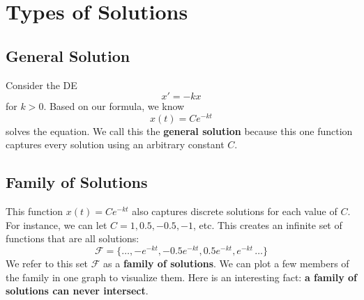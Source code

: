 \documentclass[09pt,letterpaper]{article}
\begin{document}
\section{Types of Solutions}

\subsection{General Solution}
Consider the DE 
$$x'=-kx$$ 
for $k>0$. Based on our formula, we know
$$ x(t) = C e^{-kt}$$
solves the equation. We call this the \textbf{general solution} because this one function captures every solution using an arbitrary constant $C$.

\subsection{Family of Solutions}
This function $x(t)=Ce^{-kt}$ also captures discrete solutions for each value of $C$. For instance, we can let $C=1, 0.5,-0.5,-1$, etc. This creates an infinite set of functions that are all solutions:
$$
\mathcal{F}=\{\ldots,-e^{-kt},-0.5e^{-kt},0.5e^{-kt},e^{-kt}\,\ldots\}
$$
We refer to this set $\mathcal{F}$ as a \textbf{family of solutions}. We can plot a few members of the family in one graph to visualize them. Here is an interesting fact: \textbf{a family of solutions can never intersect}.
\end{document}
